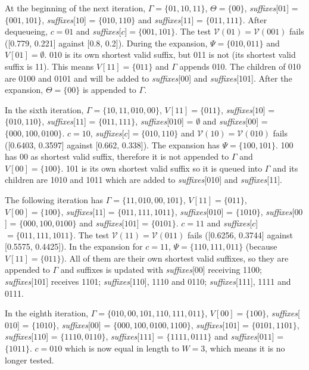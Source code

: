 {At the beginning of the next iteration, $\Gamma = \{01, 10, 11\}$, $\Theta = \{00\}$, \textit{suffixes}[$01$] = $\{001, 101\}$, \textit{suffixes}[$10$] = $\{010, 110\}$ and \textit{suffixes}[$11$] = $\{011, 111\}$. After dequeueing, $c = 01$ and \textit{suffixes}[$c$]$ = \{001, 101\}$. The test $\mathcal{V}(01) = \mathcal{V}(001)$ fails ([0.779, 0.221] against [0.8, 0.2]). During the expansion, $\Psi = \{010, 011\}$ and $V[01] = \emptyset$. 010 is its own shortest valid suffix, but 011 is not (its shortest valid suffix is 11). This means $V[11] = \{011\}$ and $\Gamma$ appends 010. The children of 010 are 0100 and 0101 and will be added to \textit{suffixes}[00] and \textit{suffixes}[101]. After the expansion, $\Theta = \{00\}$ is appended to $\Gamma$.

In the sixth iteration, $\Gamma = \{10, 11, 010, 00\}$, $V[11] = \{011\}$, \textit{suffixes}[$10$] = $\{010, 110\}$, \textit{suffixes}[$11$] = $\{011, 111\}$,  \textit{suffixes}[$010$] = $\emptyset$ and  \textit{suffixes}[$00$] = $\{000, 100, 0100\}$. $c = 10$, \textit{suffixes}[$c$]$ = \{010, 110\}$ and $\mathcal{V}(10) = \mathcal{V}(010)$ fails ([0.6403, 0.3597] against [0.662, 0.338]). The expansion has $\Psi = \{100, 101\}$. 100 has 00 as shortest valid suffix, therefore it is not appended to $\Gamma$ and $V[00] = \{100\}$. 101 is its own shortest valid suffix so it is queued into $\Gamma$ and its children are 1010 and 1011 which are added to \textit{suffixes}[010] and \textit{suffixes}[11].

The following iteration has $\Gamma = \{11, 010, 00, 101\}$, $V[11] = \{011\}$, $V[00] = \{100\}$, \textit{suffixes}[$11$] = $\{011, 111, 1011\}$,  \textit{suffixes}[$010$] = $\{1010\}$, \textit{suffixes}[$00$] = $\{000, 100, 0100\}$ and \textit{suffixes}[$101$] = $\{0101\}$. $c = 11$ and \textit{suffixes}[$c$]$ = \{011, 111, 1011\}$. The test $\mathcal{V}(11) = \mathcal{V}(011)$ fails ([0.6256, 0.3744] against [0.5575, 0.4425]). In the expansion for $c = 11$, $\Psi = \{110, 111, 011\}$ (because $V[11] = \{011\}$).  All of them are their own shortest valid suffixes, so they are appended to $\Gamma$ and suffixes is updated with \textit{suffixes}[00] receiving 1100; \textit{suffixes}[101] receives 1101; \textit{suffixes}[110], 1110 and 0110; \textit{suffixes}[111], 1111 and 0111.

In the eighth iteration, $\Gamma = \{010, 00, 101, 110, 111, 011\}$, $V[00] = \{100\}$, \textit{suffixes}[$010$] = $\{1010\}$, \textit{suffixes}[$00$] = $\{000, 100, 0100, 1100\}$, \textit{suffixes}[$101$] = $\{0101, 1101\}$, \textit{suffixes}[$110$] = $\{1110, 0110\}$, \textit{suffixes}[$111$] = $\{1111, 0111\}$ and \textit{suffixes}[$011$] = $\{1011\}$. $c = 010$ which is now equal in length to $W = 3$, which means it is no longer tested.

}

